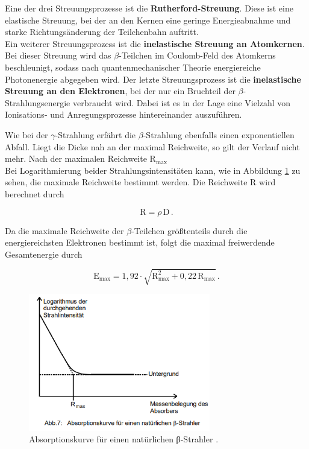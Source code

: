 \begin{flushleft}
    Eine der drei Streuungsprozesse ist die \textbf{Rutherford-Streuung}.
    Diese ist eine elastische Streuung, bei der an den Kernen eine geringe Energieabnahme und starke Richtungsänderung der Teilchenbahn auftritt.\\
    Ein weiterer Streuungsprozess ist die \textbf{inelastische Streuung an Atomkernen}.
    Bei dieser Streuung wird das $\beta$-Teilchen im Coulomb-Feld des Atomkerns beschleunigt, sodass nach quantenmechanischer Theorie energiereiche Photonenergie abgegeben wird.
    Der letzte Streuungsprozess ist die \textbf{inelastische Streuung an den Elektronen}, bei der nur ein Bruchteil der $\beta$-Strahlungsenergie verbraucht wird.
    Dabei ist es in der Lage eine Vielzahl von Ionisations- und Anregungsprozesse hintereinander auszuführen.
\end{flushleft}

\begin{flushleft}
    Wie bei der $\gamma$-Strahlung erfährt die $\beta$-Strahlung ebenfalls einen exponentiellen Abfall.
    Liegt die Dicke nah an der maximal Reichweite, so gilt der Verlauf nicht mehr.
    Nach der maximalen Reichweite $\text{R}_{\text{max}}$ \\
    Bei Logarithmierung beider Strahlungsintensitäten kann, wie in Abbildung \ref{Abbildung3} zu sehen, die maximale Reichweite bestimmt werden.
    Die Reichweite R wird berechnet durch
\end{flushleft}

\begin{equation}
     \text{R} = \rho\,\text{D}\,. \label{9}
\end{equation}

\begin{flushleft}
    Da die maximale Reichweite der $\beta$-Teilchen größtenteils durch die energiereichsten Elektronen bestimmt ist, folgt die maximal freiwerdende Gesamtenergie durch
\end{flushleft}

\begin{equation}
    \text{E}_{\text{max}} = 1,92 \cdot \sqrt{\text{R}_{\text{max}}^2 + 0,22\,\text{R}_{\text{max}}}\,. \label{10}
\end{equation}

\begin{figure}[H]
    \centering
    \includegraphics[height=60mm]{bilder/Ab3.png}
    \caption{Absorptionskurve für einen natürlichen β-Strahler \cite{a1}. \label{Abbildung3} }
\end{figure}